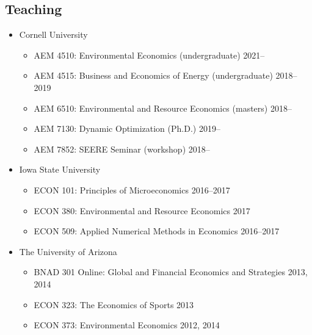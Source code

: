 \documentclass{res} %
\begin{document}
\begin{resume}
\section{Teaching}
\begin{itemize}
	\item[] Cornell University
	\vspace{-0.05in}
	\begin{itemize}[leftmargin=*] \itemsep -1pt
		\item[] AEM 4510: Environmental Economics (undergraduate) \hfill 2021--
		\item[] AEM 4515: Business and Economics of Energy (undergraduate) \hfill 2018--2019
		\item[] AEM 6510: Environmental and Resource Economics (masters) \hfill 2018--
		\item[] AEM 7130: Dynamic Optimization (Ph.D.) \hfill 2019--	
		\item[] AEM 7852: SEERE Seminar (workshop) \hfill 2018--
	\end{itemize}
	\item[] Iowa State University
	\vspace{-0.05in}
	\begin{itemize}[leftmargin=*] \itemsep -1pt
		\item[] ECON 101: Principles of Microeconomics \hfill 2016--2017
		\item[] ECON 380: Environmental and Resource Economics \hfill 2017
		\item[] ECON 509: Applied Numerical Methods in Economics \hfill 2016--2017
	\end{itemize}
	\item[] The University of Arizona
	\vspace{-0.05in}
	\begin{itemize}[leftmargin=*] \itemsep -1pt %
		\item[] BNAD 301 Online: Global and Financial Economics and Strategies \hfill 2013, 2014
		\item[] ECON 323: The Economics of Sports \hfill 2013
		\item[] ECON 373: Environmental Economics \hfill 2012, 2014
	\end{itemize}
\end{itemize}
\vspace{-.075in}


\end{resume}
\end{document}
